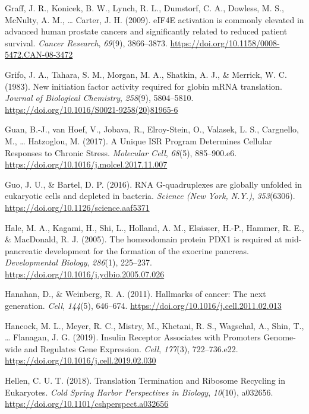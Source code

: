 \documentclass[12pt,openany]{book}
\begin{document}
\hypertarget{ref-Graff2009}{}
Graff, J. R., Konicek, B. W., Lynch, R. L., Dumstorf, C. A., Dowless, M.
S., McNulty, A. M., \ldots{} Carter, J. H. (2009). eIF4E activation is
commonly elevated in advanced human prostate cancers and significantly
related to reduced patient survival. \emph{Cancer Research},
\emph{69}(9), 3866--3873.
\url{https://doi.org/10.1158/0008-5472.CAN-08-3472}

\hypertarget{ref-Grifo1983}{}
Grifo, J. A., Tahara, S. M., Morgan, M. A., Shatkin, A. J., \& Merrick,
W. C. (1983). New initiation factor activity required for globin mRNA
translation. \emph{Journal of Biological Chemistry}, \emph{258}(9),
5804--5810. \url{https://doi.org/10.1016/S0021-9258(20)81965-6}

\hypertarget{ref-Guan2017}{}
Guan, B.-J., van Hoef, V., Jobava, R., Elroy-Stein, O., Valasek, L. S.,
Cargnello, M., \ldots{} Hatzoglou, M. (2017). A Unique ISR Program
Determines Cellular Responses to Chronic Stress. \emph{Molecular Cell},
\emph{68}(5), 885--900.e6.
\url{https://doi.org/10.1016/j.molcel.2017.11.007}

\hypertarget{ref-Guo2016}{}
Guo, J. U., \& Bartel, D. P. (2016). RNA G-quadruplexes are globally
unfolded in eukaryotic cells and depleted in bacteria. \emph{Science
(New York, N.Y.)}, \emph{353}(6306).
\url{https://doi.org/10.1126/science.aaf5371}

\hypertarget{ref-Hale2005}{}
Hale, M. A., Kagami, H., Shi, L., Holland, A. M., Elsässer, H.-P.,
Hammer, R. E., \& MacDonald, R. J. (2005). The homeodomain protein PDX1
is required at mid-pancreatic development for the formation of the
exocrine pancreas. \emph{Developmental Biology}, \emph{286}(1),
225--237. \url{https://doi.org/10.1016/j.ydbio.2005.07.026}

\hypertarget{ref-Hanahan2011}{}
Hanahan, D., \& Weinberg, R. A. (2011). Hallmarks of cancer: The next
generation. \emph{Cell}, \emph{144}(5), 646--674.
\url{https://doi.org/10.1016/j.cell.2011.02.013}

\hypertarget{ref-Hancock2019}{}
Hancock, M. L., Meyer, R. C., Mistry, M., Khetani, R. S., Wagschal, A.,
Shin, T., \ldots{} Flanagan, J. G. (2019). Insulin Receptor Associates
with Promoters Genome-wide and Regulates Gene Expression. \emph{Cell},
\emph{177}(3), 722--736.e22.
\url{https://doi.org/10.1016/j.cell.2019.02.030}

\hypertarget{ref-Hellen2018}{}
Hellen, C. U. T. (2018). Translation Termination and Ribosome Recycling
in Eukaryotes. \emph{Cold Spring Harbor Perspectives in Biology},
\emph{10}(10), a032656.
\url{https://doi.org/10.1101/cshperspect.a032656}
\end{document}
